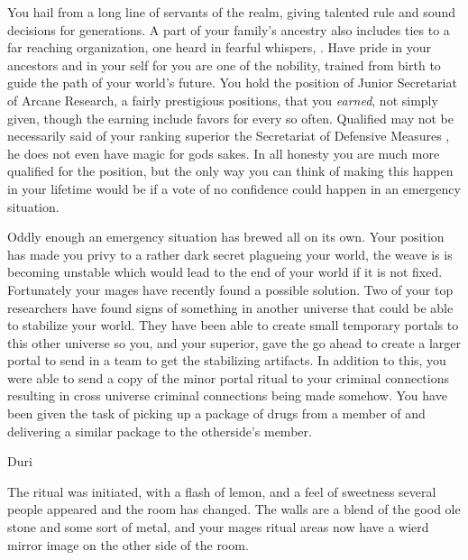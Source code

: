 \documentclass[char]{guildcamp3}
\begin{document}
\name{\cNobleTwo{}}

You hail from a long line of servants of the realm, giving talented rule and sound decisions for generations. A part of your family's ancestry also includes ties to a far reaching organization, one heard in fearful whispers, \bMagicMob{}. Have pride in your ancestors and in your self for you are one of the nobility, trained from birth to guide the path of your world's future. You hold the position of Junior Secretariat of Arcane Research, a fairly prestigious positions, that you \emph{earned}, not simply given, though the earning include favors for \bMagicMob{} every so often. Qualified may not be necessarily said of your ranking superior the Secretariat of Defensive Measures \cNobleOne{}, he does not even have magic for gods sakes. In all honesty you are much more qualified for the position, but the only way you can think of making this happen in your lifetime would be if a vote of no confidence could happen in an emergency situation. 

Oddly enough an emergency situation has brewed all on its own. Your position has made you privy to a rather dark secret plagueing your world, the weave is is becoming unstable which would lead to the end of your world if it is not fixed. Fortunately your mages have recently found a possible solution. Two of your top researchers have found signs of something in another universe that could be able to stabilize your world. They have been able to create small temporary portals to this other universe so you, and your superior, gave the go ahead to create a larger portal to send in a team to get the stabilizing artifacts. In addition to this, you were able to send a copy of the minor portal ritual to your criminal connections resulting in cross universe criminal connections being made somehow. You have been given the task of picking up a package of drugs from a member of \bTechMob{} and delivering a similar package to the otherside's member. 

Duri

The ritual was initiated, with a flash of lemon, and a feel of sweetness several people appeared and the room has changed. The walls are a blend of the good ole stone and some sort of metal, and your mages ritual areas now have a wierd mirror image on the other side of the room. 
\end{document}
